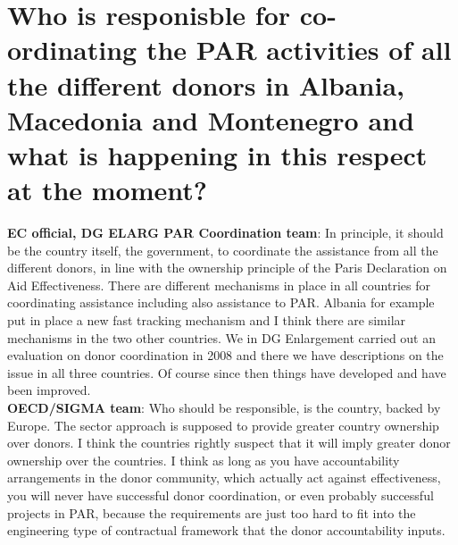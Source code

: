 \section{Who is responisble for co-ordinating the PAR activities of all the different donors in Albania, Macedonia and Montenegro and what is happening in this respect at the moment? }
\textbf{EC official, DG ELARG PAR Coordination team}: In principle, it should be the country itself, the government, to coordinate the assistance from all the different donors, in line with the ownership principle of the Paris Declaration on Aid Effectiveness. There are different mechanisms in place in all countries for coordinating assistance including also assistance to PAR. Albania for example put in place a new fast tracking mechanism and I think there are similar mechanisms in the two other countries. We in DG Enlargement carried out an evaluation on donor coordination in 2008 and there we have descriptions on the issue in all three countries. Of course since then things have developed and have been improved. \\
\textbf{OECD/SIGMA team}: Who should be responsible, is the country, backed by Europe. The sector approach is supposed to provide greater country ownership over donors. I think the countries rightly suspect that it will imply greater donor ownership over the countries. I think as long as you have accountability arrangements in the donor community, which actually act against effectiveness, you will never have successful donor coordination, or even probably successful projects in PAR, because the requirements are just too hard to fit into the engineering type of contractual framework that the
donor accountability inputs.\\
